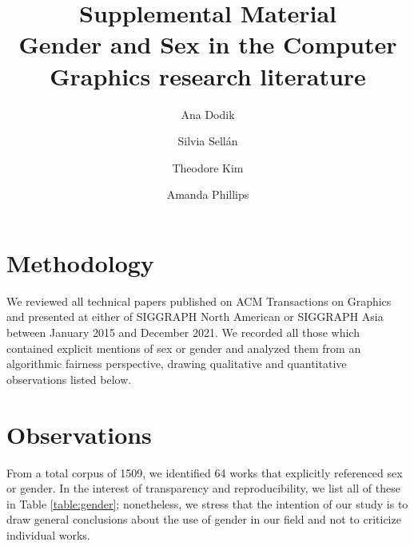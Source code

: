 \documentclass[nonacm,sigconf,review,balance=false]{acmart}
\begin{document}
\title{Supplemental Material \\
\Large{Gender and Sex in the Computer Graphics research literature}}

\author{Ana Dodik}

\author{Silvia Sellán}\authornotemark[1]


\author{Theodore Kim}

\author{Amanda Phillips}



\maketitle

\section{Methodology}

We reviewed all technical papers published on ACM Transactions on Graphics and
presented at either of SIGGRAPH North American or SIGGRAPH Asia between
January 2015 and December 2021. We recorded all those which contained
explicit mentions of sex or gender and analyzed them from an algorithmic fairness perspective, drawing qualitative and quantitative observations listed below.

\section{Observations}

From a total corpus of 1509, we identified 64 works that explicitly referenced sex or gender. In the interest of transparency and reproducibility, we list all of these in Table \ref{table:gender}; nonetheless, we stress that the intention of our study is to draw general conclusions about the use of gender in our field and not to criticize individual works.
\end{document}

